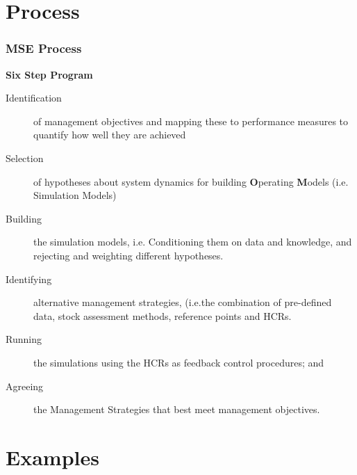 \documentclass{beamer}
\newcommand\Fontviii{\fontsize{8}{10}\selectfont}
\begin{document}
\section{Process}
\begin{frame}\frametitle{MSE Process} 
  \smallskip\textbf{Six Step Program}\smallskip
  \Fontviii
  \begin{description}%
    \item[Identification] of management objectives and mapping these to performance measures to quantify how well they are achieved\
    \item[Selection] of hypotheses about system dynamics for building \textbf{O}perating \textbf{M}odels (i.e. Simulation Models)
    \item[Building] the simulation models, i.e. Conditioning them on data and knowledge, and rejecting and weighting different hypotheses.
    \item[Identifying] alternative management strategies, (i.e.the combination of pre-defined data, stock assessment methods, reference points and HCRs.
    \item[Running] the simulations using the HCRs as feedback control procedures; and
    \item[Agreeing] the Management Strategies that best meet management objectives.
 \end{description}
 \end{frame}


\section{Examples}
\end{document}
